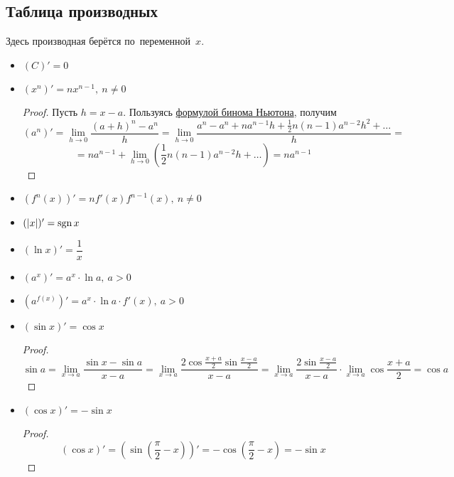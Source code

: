 \subsection{Таблица производных}
Здесь производная берётся по~переменной~$x$.
\begin{itemize}
	\item $(C)' = 0$
	
	\item $(x^n)' = nx^{n-1}, \ n \neq 0$
	\begin{proof}
	Пусть $h = x - a$.
	Пользуясь \hyperref[eq:binomial_expansion]{формулой бинома Ньютона}, получим
	\begin{equation*}
	(a^n)' =
	\lim_{h \to 0} \frac{(a + h)^n - a^n}h =
	\lim_{h \to 0} \frac{a^n - a^n + n a^{n-1} h + \frac12 n(n - 1) a^{n-2} h^2 + \ldots}h =
	\end{equation*}
	\begin{equation*}
	= n a^{n-1} + \lim_{h \to 0} \left( \frac12 n(n - 1) a^{n-2} h + \ldots \right) =
	n a^{n-1}
	\end{equation*}
	\end{proof}
	
	\item $(f^n(x))' = nf'(x)f^{n-1}(x), \ n \neq 0$
	
	\item $(|x|)' = \operatorname{sgn} x$
		
	\item $(\ln x)' = \dfrac1x$
	
	\item $(a^x)' = a^x \cdot \ln a, \ a > 0$
	
	\item $(a^{f(x)})' = a^x \cdot \ln a \cdot f'(x), \ a > 0$
	
	\item $(\sin x)' = \cos x$
	\begin{proof}
	\begin{equation*}
	\sin a =
	\lim_{x \to a} \frac{\sin x - \sin a}{x - a} =
	\lim_{x \to a} \frac{2 \cos \frac{x + a}2 \sin \frac{x - a}2}{x - a} =
	\lim_{x \to a} \frac{2 \sin \frac{x - a}2}{x - a} \cdot \lim_{x \to a} \cos \frac{x + a}2 =
	\cos a
	\end{equation*}
	\end{proof}
	
	\item $(\cos x)' = -\sin x$
	\begin{proof}
	\begin{equation*}
	(\cos x)' =
	(\sin \left( \frac\pi{2} - x \right))' =
	-\cos \left( \frac\pi{2} - x \right) =
	-\sin x
	\end{equation*}
	\end{proof}
	

\end{itemize}
